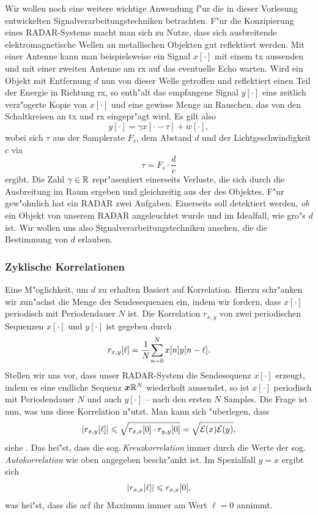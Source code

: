 Wir wollen noch eine weitere wichtige Anwendung f"ur die in dieser Vorlesung entwickelten Signalverarbeitungstechniken betrachten.
F"ur die Konzipierung eines RADAR-Systems macht man sich zu Nutze, dass sich ausbreitende elektromagnetische Wellen an metallischen Objekten gut reflektiert werden.
Mit einer Antenne kann man beispielsweise ein Signal $x[\cdot]$ mit einem \gls{tx} aussenden und mit einer zweiten Antenne am \gls{rx} auf das eventuelle Echo warten.
Wird ein Objekt mit Entfernung $d$ nun von dieser Welle getroffen und reflektiert einen Teil der Energie in Richtung \gls{rx}, so enth"alt das empfangene Signal $y[\cdot]$ eine zeitlich verz"ogerte Kopie von $x[\cdot]$ und eine gewisse Menge an Rauschen, das von den Schaltkreisen an \gls{tx} und \gls{rx} eingepr"agt wird.
Es gilt also
\[
y[\cdot] = \gamma x[\cdot - \tau] + w[\cdot],
\]
wobei sich $\tau$ aus der Samplerate $F_s$, dem Abstand $d$ und der Lichtgeschwindigkeit $c$ via
\[
\tau = F_s \cdot \frac{d}{c} 
\]
ergibt.
Die Zahl $\gamma \in \mathbb{R}$ repr"asentiert einerseits Verluste, die sich durch die Ausbreitung im Raum ergeben und gleichzeitig aus der  des Objektes.
F"ur gew"ohnlich hat ein RADAR zwei Aufgaben. 
Einerseits soll detektiert werden, \emph{ob} ein Objekt von unserem RADAR angeleuchtet wurde und im Idealfall, wie gro"s $d$ ist.
Wir wollen uns also Signalverarbeitungstechniken ansehen, die die Bestimmung von $d$ erlauben.
%
\subsubsection{Zyklische Korrelationen}
%
Eine M"oglichkeit, um $d$ zu erhalten Basiert auf Korrelation.
Hierzu schr"anken wir zun"achst die Menge der Sendesequenzen ein, indem wir fordern, dass $x[\cdot]$ periodisch mit Periodendauer $N$ ist.
Die Korrelation $r_{x,y}$ von zwei periodischen Sequenzen $x[\cdot]$ und $y[\cdot]$ ist gegeben durch
\begin{equation}\label{eq:mseq:corr}
    r_{x,y}[\ell] = \frac{1}{N}{\sum\limits_{n = 0}^{N}{
        x[n]y[n - \ell]
    }}.
\end{equation}
Stellen wir uns vor, dass unser RADAR-System die Sendesequenz $x[\cdot]$ erzeugt, indem es eine endliche Sequenz $\bm x \mathbb{R}^{N}$ wiederholt aussendet, so ist $x[\cdot]$ periodisch mit Periodendauer $N$ und auch $y[\cdot]$ -- nach den ersten $N$ Samples.
Die Frage ist nun, was uns diese Korrelation n"utzt.
Man kann sich "uberlegen, dass
\[
{\left| r_{x,y}[\ell] \right|} 
    \leqslant \sqrt{
        r_{x,x}[0] \cdot r_{y,y}[0] 
    }
    = \sqrt{
        \mathcal{E}(x) \mathcal{E}(y)
    },
\]
siehe .
Das hei"st, dass die sog.\,\emph{Kreuzkorrelation} immer durch die Werte der sog.\,\emph{Autokorrelation} wie oben angegeben beschr"ankt ist.
Im Spezialfall $y=x$ ergibt sich
\[
{\left| r_{x,x}[\ell] \right|} \leqslant r_{x,x}[0],
\]
was hei"st, dass die \gls{acf} ihr Maximum immer am Wert $\ell=0$ annimmt.


